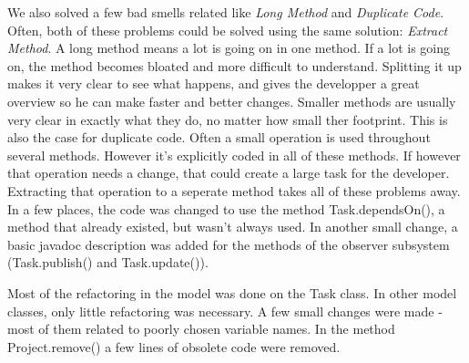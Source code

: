 We also solved a few bad smells related like \emph{Long Method} and
\emph{Duplicate Code}. Often, both of these problems could be solved using the
same solution: \emph{Extract Method}.
A long method means a lot is going on in one method. If a lot is going on, the
method becomes bloated and more difficult to understand.
Splitting it up makes it very clear to see what happens, and gives the
developper a great overview so he can make faster and better changes.
Smaller methods are usually very clear in exactly what they do, no matter how
small ther footprint.
This is also the case for duplicate code. Often a small operation is used
throughout several methods. However it's explicitly coded in all of these
methods.
If however that operation needs a change, that could create a large task for the
developer.
Extracting that operation to a seperate method takes all of these problems away.
In a few places, the code was changed to use the method Task.dependsOn(), a method that already existed, but wasn't always used.
In another small change, a basic javadoc description was added for the methods of the observer subsystem (Task.publish() and Task.update()).


Most of the refactoring in the model was done on the Task class. In other model classes, only little refactoring was necessary. A few small changes were made - most of them related to poorly chosen variable names. 
In the method Project.remove() a few lines of obsolete code were removed.
